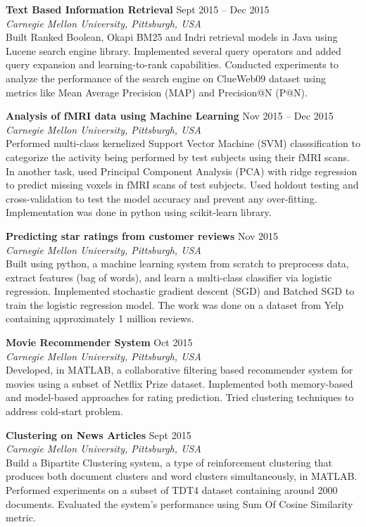 \documentclass[margin,line]{resume}
\begin{document}
\begin{resume}
		\textbf{Text Based Information Retrieval} \hfill Sept 2015 -- Dec 2015 \\
  		\textit{Carnegie Mellon University, Pittsburgh, USA} \\
		Built Ranked Boolean, Okapi BM25 and Indri retrieval models in Java using Lucene search engine library. Implemented several query operators and added query expansion and learning-to-rank capabilities. 
		Conducted experiments to analyze the performance of the search engine on ClueWeb09 dataset using metrics like Mean Average Precision (MAP) and Precision@N (P@N).

		\textbf{Analysis of fMRI data using Machine Learning} \hfill Nov 2015 -- Dec 2015 \\
  		\textit{Carnegie Mellon University, Pittsburgh, USA} \\
		Performed multi-class kernelized Support Vector Machine (SVM) classsification to categorize the activity being performed by test subjects using their fMRI scans. In another task, used Principal Component 				Analysis (PCA) with ridge regression to predict missing voxels in fMRI scans of test subjects. Used holdout testing and cross-validation to test the model accuracy and prevent any over-fitting. Implementation 			was done in python using scikit-learn library.

		\textbf{Predicting star ratings from customer reviews} \hfill Nov 2015 \\
  		\textit{Carnegie Mellon University, Pittsburgh, USA} \\
		Built using python, a machine learning system from scratch to preprocess data, extract features (bag of words), and learn a multi-class classifier via logistic regression. Implemented stochastic gradient descent (SGD) and Batched SGD to train the logistic regression model. The work was done on a dataset from Yelp containing approximately 1 million reviews.

		\textbf{Movie Recommender System} \hfill Oct 2015 \\
  		\textit{Carnegie Mellon University, Pittsburgh, USA} \\
		Developed, in MATLAB, a collaborative filtering based recommender system for movies using a subset of Netflix Prize dataset. Implemented both memory-based and model-based approaches for rating 				prediction. Tried clustering techniques to address cold-start problem. 
	
		\textbf{Clustering on News Articles} \hfill Sept 2015 \\
  		\textit{Carnegie Mellon University, Pittsburgh, USA} \\
		Build a Bipartite Clustering system, a type of reinforcement clustering that produces both document clusters and word clusters simultaneously, in MATLAB. Performed experiments on a subset of TDT4 dataset 		containing around 2000 documents. Evaluated the system's performance using Sum Of Cosine Similarity metric. 


\end{resume}
\end{document}
